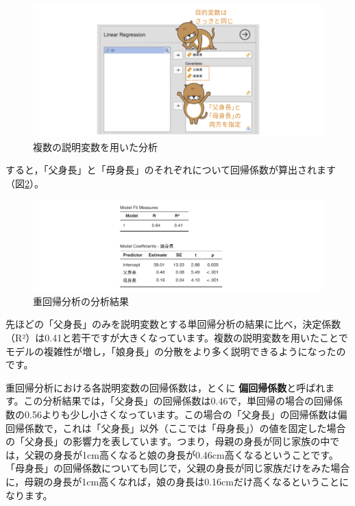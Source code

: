 \documentclass[
  12pt,
  a5jpaper,
  lualatex, ja=standard]{bxjsbook}
\renewcommand{\emph}[1]{\textbf{\color{emph} #1}}
\begin{document}
\begin{figure}[!ht]

{\centering \includegraphics[width=1\linewidth]{images/regression/lr-multireg-analysis} 

}

\caption{複数の説明変数を用いた分析}\label{fig:regression-lr-multireg-analysis}
\end{figure}

すると，「父身長」と「母身長」のそれぞれについて回帰係数が算出されます（図\ref{fig:regression-lr-multireg-results}）。

\begin{figure}[!ht]

{\centering \includegraphics[width=1\linewidth]{images/regression/lr-multireg-resutls} 

}

\caption{重回帰分析の分析結果}\label{fig:regression-lr-multireg-results}
\end{figure}

先ほどの「父身長」のみを説明変数とする単回帰分析の結果に比べ，決定係数（R²）は0.41と若干ですが大きくなっています。複数の説明変数を用いたことでモデルの複雑性が増し，「娘身長」の分散をより多く説明できるようになったのです。

重回帰分析における各説明変数の回帰係数は，とくに\emph{偏回帰係数}と呼ばれます。この分析結果では，「父身長」の回帰係数は0.46で，単回帰の場合の回帰係数の0.56よりも少し小さくなっています。この場合の「父身長」の回帰係数は偏回帰係数で，これは「父身長」以外（ここでは「母身長」）の値を固定した場合の「父身長」の影響力を表しています。つまり，母親の身長が同じ家族の中では，父親の身長が1cm高くなると娘の身長が0.46cm高くなるということです。「母身長」の回帰係数についても同じで，父親の身長が同じ家族だけをみた場合に，母親の身長が1cm高くなれば，娘の身長は0.16cmだけ高くなるということになります。
\end{document}
